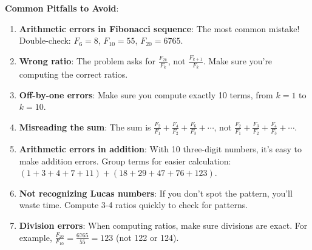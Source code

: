 \documentclass[12pt]{article}
\begin{document}
\begin{warningbox}
\textbf{Common Pitfalls to Avoid}:

\begin{enumerate}
    \item \textbf{Arithmetic errors in Fibonacci sequence}: The most common mistake! Double-check: $F_6 = 8$, $F_{10} = 55$, $F_{20} = 6765$.
    
    \item \textbf{Wrong ratio}: The problem asks for $\frac{F_{2k}}{F_k}$, not $\frac{F_{k+1}}{F_k}$. Make sure you're computing the correct ratios.
    
    \item \textbf{Off-by-one errors}: Make sure you compute exactly 10 terms, from $k=1$ to $k=10$.
    
    \item \textbf{Misreading the sum}: The sum is $\frac{F_2}{F_1} + \frac{F_4}{F_2} + \frac{F_6}{F_3} + \cdots$, not $\frac{F_2}{F_1} + \frac{F_3}{F_2} + \frac{F_4}{F_3} + \cdots$.
    
    \item \textbf{Arithmetic errors in addition}: With 10 three-digit numbers, it's easy to make addition errors. Group terms for easier calculation: $(1+3+4+7+11) + (18+29+47+76+123)$.
    
    \item \textbf{Not recognizing Lucas numbers}: If you don't spot the pattern, you'll waste time. Compute 3-4 ratios quickly to check for patterns.
    
    \item \textbf{Division errors}: When computing ratios, make sure divisions are exact. For example, $\frac{F_{20}}{F_{10}} = \frac{6765}{55} = 123$ (not 122 or 124).
\end{enumerate}
\end{warningbox}
\end{document}
